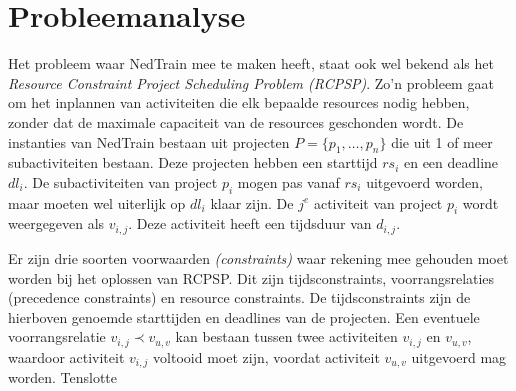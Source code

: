 \section{Probleemanalyse}

Het probleem waar NedTrain mee te maken heeft, staat ook wel bekend als het \emph{Resource Constraint Project Scheduling Problem (RCPSP)}. Zo'n probleem gaat om het inplannen van activiteiten die elk bepaalde resources nodig hebben, zonder dat de maximale capaciteit van de resources geschonden wordt. De instanties van NedTrain bestaan uit projecten $P = \{p_1, \dots , p_n\}$ die uit 1 of meer subactiviteiten bestaan. Deze projecten hebben een starttijd $rs_i$ en een deadline $dl_i$. De subactiviteiten van project $p_i$ mogen pas vanaf $rs_i$ uitgevoerd worden, maar moeten wel uiterlijk op $dl_i$ klaar zijn. De $j^e$ activiteit van project $p_i$ wordt weergegeven als $v_{i,j}$. Deze activiteit heeft een tijdsduur van $d_{i,j}$.

Er zijn drie soorten voorwaarden \emph{(constraints)} waar rekening mee gehouden moet worden bij het oplossen van RCPSP. Dit zijn tijdsconstraints, voorrangsrelaties (precedence constraints) en resource constraints. De tijdsconstraints zijn de hierboven genoemde starttijden en deadlines van de projecten. Een eventuele voorrangsrelatie $v_{i,j} \prec v_{u,v}$ kan bestaan tussen twee activiteiten $v_{i,j}$ en $v_{u,v}$, waardoor activiteit $v_{i,j}$ voltooid moet zijn, voordat activiteit $v_{u,v}$ uitgevoerd mag worden. Tenslotte 